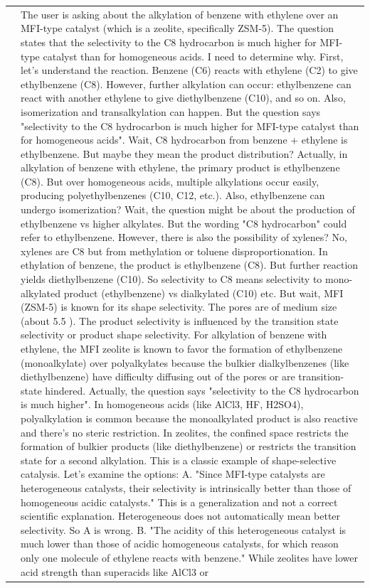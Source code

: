 \begin{longtable}{@{}l p{12.5cm}@{}}
  & The user is asking about the alkylation of benzene with ethylene over an MFI-type catalyst (which is a zeolite, specifically ZSM-5). The question states that the selectivity to the C8 hydrocarbon is much higher for MFI-type catalyst than for homogeneous acids. I need to determine why. \newline First, let's understand the reaction. Benzene (C6) reacts with ethylene (C2) to give ethylbenzene (C8). However, further alkylation can occur: ethylbenzene can react with another ethylene to give diethylbenzene (C10), and so on. Also, isomerization and transalkylation can happen. But the question says "selectivity to the C8 hydrocarbon is much higher for MFI-type catalyst than for homogeneous acids". Wait, C8 hydrocarbon from benzene + ethylene is ethylbenzene. But maybe they mean the product distribution? Actually, in alkylation of benzene with ethylene, the primary product is ethylbenzene (C8). But over homogeneous acids, multiple alkylations occur easily, producing polyethylbenzenes (C10, C12, etc.). Also, ethylbenzene can undergo isomerization? Wait, the question might be about the production of ethylbenzene vs higher alkylates. But the wording "C8 hydrocarbon" could refer to ethylbenzene. However, there is also the possibility of xylenes? No, xylenes are C8 but from methylation or toluene disproportionation. In ethylation of benzene, the product is ethylbenzene (C8). But further reaction yields diethylbenzene (C10). So selectivity to C8 means selectivity to mono-alkylated product (ethylbenzene) vs dialkylated (C10) etc. \newline But wait, MFI (ZSM-5) is known for its shape selectivity. The pores are of medium size (about 5.5 ). The product selectivity is influenced by the transition state selectivity or product shape selectivity. For alkylation of benzene with ethylene, the MFI zeolite is known to favor the formation of ethylbenzene (monoalkylate) over polyalkylates because the bulkier dialkylbenzenes (like diethylbenzene) have difficulty diffusing out of the pores or are transition-state hindered. Actually, the question says "selectivity to the C8 hydrocarbon is much higher". In homogeneous acids (like AlCl3, HF, H2SO4), polyalkylation is common because the monoalkylated product is also reactive and there's no steric restriction. In zeolites, the confined space restricts the formation of bulkier products (like diethylbenzene) or restricts the transition state for a second alkylation. This is a classic example of shape-selective catalysis. \newline Let's examine the options: \newline A. "Since MFI-type catalysts are heterogeneous catalysts, their selectivity is intrinsically better than those of homogeneous acidic catalysts." This is a generalization and not a correct scientific explanation. Heterogeneous does not automatically mean better selectivity. So A is wrong. \newline B. "The acidity of this heterogeneous catalyst is much lower than those of acidic homogeneous catalysts, for which reason only one molecule of ethylene reacts with benzene." While zeolites have lower acid strength than superacids like AlCl3 or 
\end{longtable}
